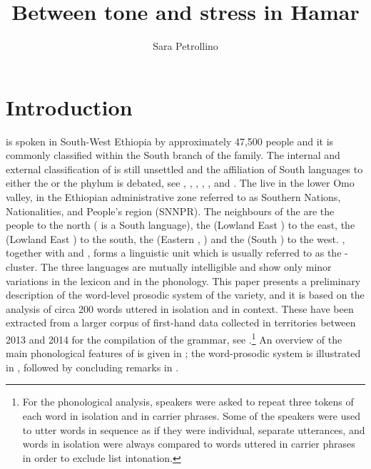 \documentclass[output=paper,modfonts,nonflat,hidelinks]{langsci/langscibook}
\author{Sara Petrollino
\affiliation{Laboratoire Dynamique Du Langage, Lyon and Leiden University}
}
\title{Between tone and stress in Hamar}
\begin{document}
\maketitle 

\section{Introduction} \label{sec:Petrollino:1}

 is spoken in South-West Ethiopia by approximately 47,500 people \citep{SimonsFenning2017} and it is commonly classified within the South  branch of the  family. The internal and external classification of  is still unsettled and the affiliation of South  languages to either the  or the  phylum is debated, see \citet{Zaborski2004}, \citet{Blažek2008}, \citet{Bender2000, Bender2003}, \citet{Hayward2003}, \citet{Fleming1974}, and \citet{Azeb2012}. The  live in the lower Omo valley, in the Ethiopian administrative zone referred to as Southern Nations, Nationalities, and People's region (SNNPR). The neighbours of the  are the  people to the north ( is a South  language), the  (Lowland East ) to the east, the  (Lowland East ) to the south, the  (Eastern , ) and the  (South ) to the west. , together with  and , forms a linguistic unit which is usually referred to as the - cluster. The three languages are mutually intelligible and show only minor variations in the lexicon and in the phonology. This paper presents a preliminary description of the word-level prosodic system of the  variety, and it is based on the analysis of circa 200  words uttered in isolation and in context. These have been extracted from a larger corpus of first-hand data collected in  territories between 2013 and 2014 for the compilation of the  grammar, see \citet{Petrollino2016}.\footnote{For the phonological analysis, speakers were asked to repeat three tokens of each word in isolation and in carrier phrases. Some of the speakers were used to utter words in sequence as if they were individual, separate utterances, and words in isolation were always compared to words uttered in carrier phrases in order to exclude list intonation.} An overview of the main phonological features of  is given in ; the word-prosodic system is illustrated in , followed by concluding remarks in .  
\end{document}
